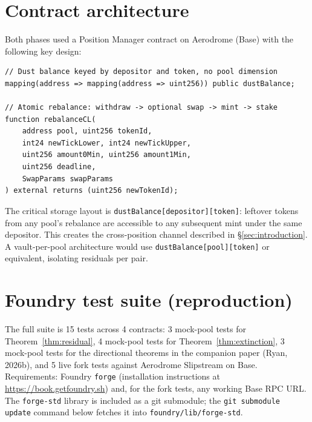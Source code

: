 \documentclass[11pt,a4paper]{article}
\newenvironment{codeblock}{%
  \begin{mdframed}[%
    backgroundcolor=brown!3!white,%
    linewidth=0pt,%
    innertopmargin=6pt,%
    innerbottommargin=6pt,%
    innerleftmargin=12pt,%
    innerrightmargin=12pt,%
    leftmargin=0.075\linewidth,%
    rightmargin=0.075\linewidth,%
    skipabove=6pt,%
    skipbelow=6pt%
  ]\footnotesize%
}{%
  \end{mdframed}%
}
\begin{document}
\appendix
{}
\titlespacing*{\section}{0pt}{18pt}{8pt}

\section{Contract architecture}\label{app:contract}

Both phases used a Position Manager contract on Aerodrome (Base) with the following key design:

\begin{codeblock}\begin{verbatim}
// Dust balance keyed by depositor and token, no pool dimension
mapping(address => mapping(address => uint256)) public dustBalance;

// Atomic rebalance: withdraw -> optional swap -> mint -> stake
function rebalanceCL(
    address pool, uint256 tokenId,
    int24 newTickLower, int24 newTickUpper,
    uint256 amount0Min, uint256 amount1Min,
    uint256 deadline,
    SwapParams swapParams
) external returns (uint256 newTokenId);
\end{verbatim}\end{codeblock}

The critical storage layout is \texttt{dustBalance[depositor][token]}: leftover tokens from any pool's rebalance are accessible to any subsequent mint under the same depositor. This creates the cross-position channel described in \S\ref{sec:introduction}. A vault-per-pool architecture would use \texttt{dustBalance\allowbreak{}[pool][token]} or equivalent, isolating residuals per pair.

\section{Foundry test suite (reproduction)}\label{app:foundry}

The full suite is 15 tests across 4 contracts: 3 mock-pool tests for Theorem~\ref{thm:residual}, 4 mock-pool tests for Theorem~\ref{thm:extinction}, 3 mock-pool tests for the directional theorems in the companion paper (Ryan, 2026b), and 5 live fork tests against Aerodrome Slipstream on Base. Requirements: Foundry \texttt{forge} (installation instructions at \url{https://book.getfoundry.sh}) and, for the fork tests, any working Base RPC URL. The \texttt{forge-std} library is included as a git submodule; the \texttt{git submodule update} command below fetches it into \texttt{foundry/lib/forge-std}.
\end{document}
